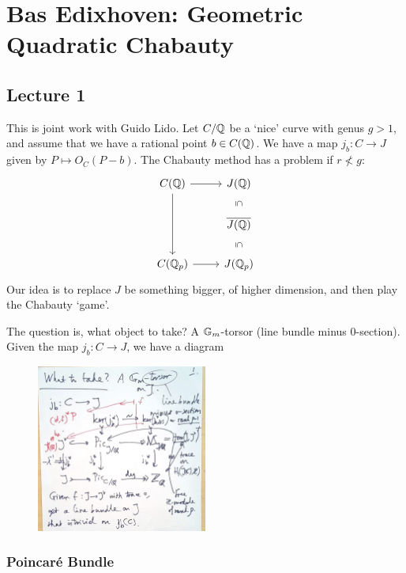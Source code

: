 \newpage
\section{Bas Edixhoven: Geometric Quadratic Chabauty}
\subsection{Lecture 1}

This is joint work with Guido Lido. Let $C/\mathbb{Q}$ be a `nice' curve with genus $g>1$, and assume that we have a rational point $b \in C(\mathbb{Q})$. We have a map $j_b: C \to J$ given by $P \mapsto O_C(P-b)$. The Chabauty method has a problem if $r \not<g$:
	\[
	\begin{tikzcd}
	C(\Q) \arrow{r} \arrow{dd} & J(\Q) \arrow[draw=none]{d}[sloped,auto=false]{\subseteq} \\
	&  \ov{J(\Q)} \arrow[draw=none]{d}[sloped,auto=false]{\subseteq} \\
	C(\Qp) \arrow{r} & J(\Qp) 
	\end{tikzcd}
	\]
Our idea is to replace $J$ be something bigger, of higher dimension, and then play the Chabauty `game'.


The question is, what object to take? A $\mathbb{G}_m$-torsor (line bundle minus 0-section). Given the map $j_b: C \to J$, we have a diagram

	\begin{figure}[!ht]
	\centering
	\includegraphics[width=0.5\textwidth]{../images/im5.png}
	\end{figure}


\subsubsection{Poincar\'e Bundle}

